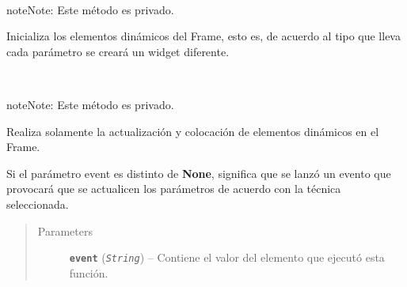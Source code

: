 \documentclass[letterpaper,10pt,english]{sphinxmanual}
\begin{document}
\begin{fulllineitems}
\begin{fulllineitems}
\label{View/Main/Population/TemplatePopulation/TemplatePopulationFrame:View.Main.Population.TemplatePopulation.TemplatePopulationFrame.TemplatePopulationFrame._TemplatePopulationFrame__create_dynamic_widgets}~
\begin{notice}{note}{Note:}
Este método es privado.
\end{notice}

Inicializa los elementos dinámicos del Frame, esto es, de acuerdo al tipo 
que lleva cada parámetro se creará un widget diferente.

\end{fulllineitems}


\begin{fulllineitems}
\label{View/Main/Population/TemplatePopulation/TemplatePopulationFrame:View.Main.Population.TemplatePopulation.TemplatePopulationFrame.TemplatePopulationFrame._TemplatePopulationFrame__update_widgets}~
\begin{notice}{note}{Note:}
Este método es privado.
\end{notice}

\begin{DUlineblock}{0em}
\item[] Realiza solamente la actualización y colocación de elementos dinámicos 
en el Frame.
\item[] Si el parámetro event es distinto de \textbf{None}, significa que se lanzó 
un evento que provocará que se actualicen los parámetros de acuerdo con
la técnica seleccionada.
\end{DUlineblock}
\begin{quote}\begin{description}
\item[{Parameters}] \leavevmode
\textbf{\texttt{event}} (\emph{\texttt{String}}) -- Contiene el valor del elemento que ejecutó esta función.

\end{description}\end{quote}

\end{fulllineitems}


\end{fulllineitems}
\end{document}
